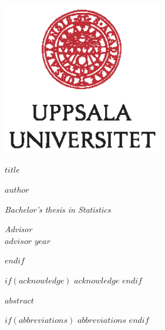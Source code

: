 \documentclass[a4paper,11pt]{article}
\renewcommand{\baselinestretch}{1.5}
\begin{document}
\thispagestyle{empty}
\begin{center}
\includegraphics[width=7cm]{UU_logo_CMYK.eps}
\end{center}
\vspace{1.5cm}
\begin{center}
\begin{Large}
{\bf $title$}
\end{Large}
\end{center}
\vskip1.5cm
\renewcommand{\baselinestretch}{1}
\begin{center}
{\large $author$}
\vskip2.5cm
\begin{center}
\begin{large}
{\it Bachelor's thesis in Statistics}\\
\end{large}
\end{center}
\vskip2cm
{\large\it Advisor}\\
{\large $advisor$}
\vskip2cm
{\large $year$}
\end{center}\vfill
$endif$


$if(acknowledge)$
\newpage
$acknowledge$
$endif$
\pagestyle{plain}
\setcounter{page}{1}    %

\newpage
$abstract$

\newpage
\tableofcontents
\clearpage

$if(abbreviations)$
\newpage
$abbreviations$
$endif$
\end{document}
